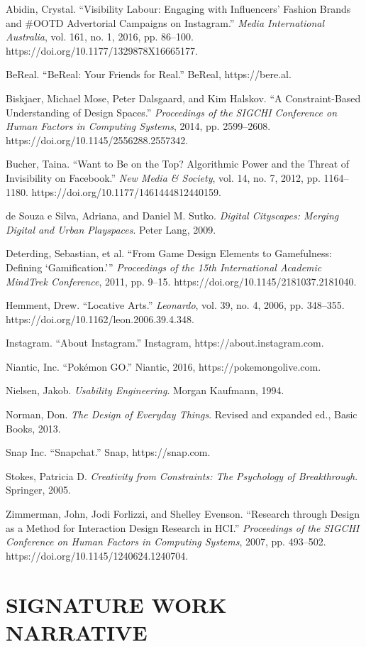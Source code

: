 \documentclass[12pt]{article}
\begin{document}
{\setlength{\parindent}{0pt}%
\setlength{\parskip}{0.5\baselineskip}%
\newcommand{\mlaentry}[1]{\noindent\hangindent=0.5in #1\par}%
\mlaentry{Abidin, Crystal. “Visibility Labour: Engaging with Influencers’ Fashion Brands and \#OOTD Advertorial Campaigns on Instagram.” \textit{Media International Australia}, vol. 161, no. 1, 2016, pp. 86--100. https://doi.org/10.1177/1329878X16665177.}
\mlaentry{BeReal. “BeReal: Your Friends for Real.” BeReal, https://bere.al.}
\mlaentry{Biskjaer, Michael Mose, Peter Dalsgaard, and Kim Halskov. “A Constraint-Based Understanding of Design Spaces.” \textit{Proceedings of the SIGCHI Conference on Human Factors in Computing Systems}, 2014, pp. 2599--2608. https://doi.org/10.1145/2556288.2557342.}
\mlaentry{Bucher, Taina. “Want to Be on the Top? Algorithmic Power and the Threat of Invisibility on Facebook.” \textit{New Media \& Society}, vol. 14, no. 7, 2012, pp. 1164--1180. https://doi.org/10.1177/1461444812440159.}
\mlaentry{de Souza e Silva, Adriana, and Daniel M. Sutko. \textit{Digital Cityscapes: Merging Digital and Urban Playspaces}. Peter Lang, 2009.}
\mlaentry{Deterding, Sebastian, et al. “From Game Design Elements to Gamefulness: Defining ‘Gamification.’” \textit{Proceedings of the 15th International Academic MindTrek Conference}, 2011, pp. 9--15. https://doi.org/10.1145/2181037.2181040.}
\mlaentry{Hemment, Drew. “Locative Arts.” \textit{Leonardo}, vol. 39, no. 4, 2006, pp. 348--355. https://doi.org/10.1162/leon.2006.39.4.348.}
\mlaentry{Instagram. “About Instagram.” Instagram, https://about.instagram.com.}
\mlaentry{Niantic, Inc. “Pokémon GO.” Niantic, 2016, https://pokemongolive.com.}
\mlaentry{Nielsen, Jakob. \textit{Usability Engineering}. Morgan Kaufmann, 1994.}
\mlaentry{Norman, Don. \textit{The Design of Everyday Things}. Revised and expanded ed., Basic Books, 2013.}
\mlaentry{Snap Inc. “Snapchat.” Snap, https://snap.com.}
\mlaentry{Stokes, Patricia D. \textit{Creativity from Constraints: The Psychology of Breakthrough}. Springer, 2005.}
\mlaentry{Zimmerman, John, Jodi Forlizzi, and Shelley Evenson. “Research through Design as a Method for Interaction Design Research in HCI.” \textit{Proceedings of the SIGCHI Conference on Human Factors in Computing Systems}, 2007, pp. 493--502. https://doi.org/10.1145/1240624.1240704.}
}

\clearpage


\section*{SIGNATURE WORK NARRATIVE}
\end{document}
